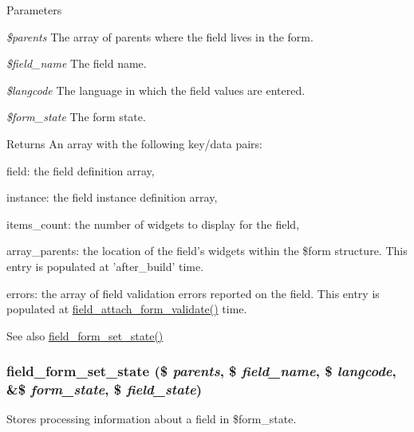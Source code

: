 \begin{DoxyParams}{Parameters}
\item[{\em \$parents}]The array of parents where the field lives in the form. \item[{\em \$field\_\-name}]The field name. \item[{\em \$langcode}]The language in which the field values are entered. \item[{\em \$form\_\-state}]The form state.\end{DoxyParams}
\begin{DoxyReturn}{Returns}
An array with the following key/data pairs:
\begin{DoxyItemize}
\item field: the field definition array,
\item instance: the field instance definition array,
\item items\_\-count: the number of widgets to display for the field,
\item array\_\-parents: the location of the field's widgets within the \$form structure. This entry is populated at 'after\_\-build' time.
\item errors: the array of field validation errors reported on the field. This entry is populated at \hyperlink{group__field__attach_ga8c9a9775772774cefae4f6b9959d477e}{field\_\-attach\_\-form\_\-validate()} time.
\end{DoxyItemize}
\end{DoxyReturn}
\begin{DoxySeeAlso}{See also}
\hyperlink{field_8form_8inc_a8e21a8b058d1a84d91d1a326242e303e}{field\_\-form\_\-set\_\-state()} 
\end{DoxySeeAlso}
\hypertarget{field_8form_8inc_a8e21a8b058d1a84d91d1a326242e303e}{
\subsubsection[{field\_\-form\_\-set\_\-state}]{\setlength{\rightskip}{0pt plus 5cm}field\_\-form\_\-set\_\-state (\$ {\em parents}, \/  \$ {\em field\_\-name}, \/  \$ {\em langcode}, \/  \&\$ {\em form\_\-state}, \/  \$ {\em field\_\-state})}}
\label{field_8form_8inc_a8e21a8b058d1a84d91d1a326242e303e}
Stores processing information about a field in \$form\_\-state.


